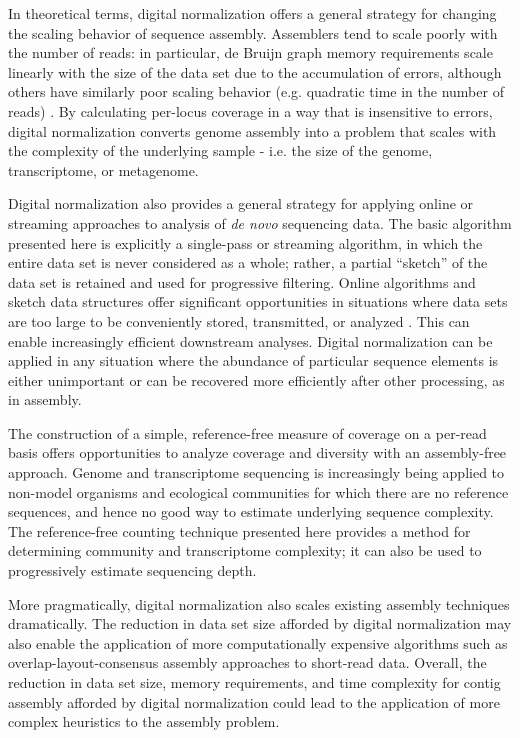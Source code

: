 In theoretical terms, digital normalization offers a general strategy
for changing the scaling behavior of sequence assembly.  Assemblers
tend to scale poorly with the number of reads: in particular, de
Bruijn graph memory requirements scale linearly with the size of the
data set due to the accumulation of errors, although others have
similarly poor scaling behavior (e.g. quadratic time in the number of
reads) \cite{pubmed20211242}.  By calculating per-locus coverage in a way that
is insensitive to errors, digital normalization converts
genome assembly into a problem that scales with the complexity of the
underlying sample - i.e. the size of the genome, transcriptome, or
metagenome.

Digital normalization also provides a general strategy for applying
online or streaming approaches to analysis of {\em de novo} sequencing
data.  The basic algorithm presented here is explicitly a single-pass or streaming
algorithm, in which the entire data set is never considered as a
whole; rather, a partial ``sketch'' of the data set is retained and
used for progressive filtering.  Online algorithms and sketch data
structures offer significant opportunities in situations where data
sets are too large to be conveniently stored, transmitted, or analyzed
\cite{muthukrishnan2005data}.  This can enable increasingly efficient
downstream analyses.
Digital normalization can be applied in any situation where the
abundance of particular sequence elements is either unimportant or can be
recovered more efficiently after other processing, as in assembly.

The construction of a simple, reference-free measure of coverage on a
per-read basis offers opportunities to analyze coverage and
diversity with an assembly-free approach.  Genome and transcriptome
sequencing is increasingly being applied to non-model organisms and
ecological communities for which there are no reference sequences, and
hence no good way to estimate underlying sequence complexity.  The
reference-free counting technique presented here provides a method for
determining community and transcriptome complexity;
it can also be used to progressively estimate sequencing depth.

More pragmatically, digital normalization also scales existing
assembly techniques dramatically.
The reduction in data set size afforded by
digital normalization may also enable the application of more
computationally expensive algorithms such as overlap-layout-consensus
assembly approaches to short-read data.  Overall, the reduction in
data set size, memory requirements, and time complexity for contig
assembly afforded by digital normalization could lead to the
application of more complex heuristics to the assembly problem.

